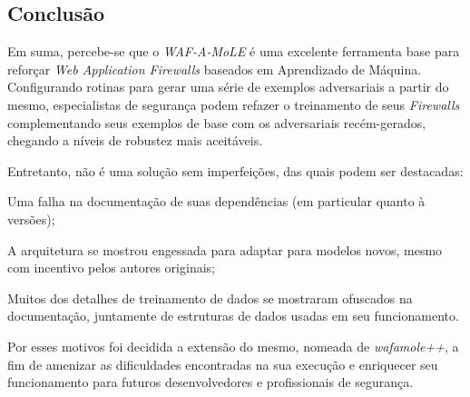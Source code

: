\subsection{Conclusão}
Em suma, percebe-se que o \textit{WAF-A-MoLE} é uma excelente ferramenta base para reforçar \textit{Web Application Firewalls} baseados em Aprendizado de Máquina. Configurando rotinas para gerar uma série de exemplos adversariais a partir do mesmo, especialistas de segurança podem refazer o treinamento de seus \textit{Firewalls} complementando seus exemplos de base com os adversariais recém-gerados, chegando a níveis de robustez mais aceitáveis. 

Entretanto, não é uma solução sem imperfeições, das quais podem ser destacadas:
\begin{alineas}
\item Uma falha na documentação de suas dependências (em particular quanto à versões);
\item A arquitetura se mostrou engessada para adaptar para modelos novos, mesmo com incentivo pelos autores originais;
\item Muitos dos detalhes de treinamento de dados se mostraram ofuscados na documentação, juntamente de estruturas de dados usadas em seu funcionamento.
\end{alineas}

Por esses motivos foi decidida a extensão do mesmo, nomeada de \textit{wafamole++}, a fim de amenizar as dificuldades encontradas na sua execução e enriquecer seu funcionamento para futuros desenvolvedores e profissionais de segurança.


